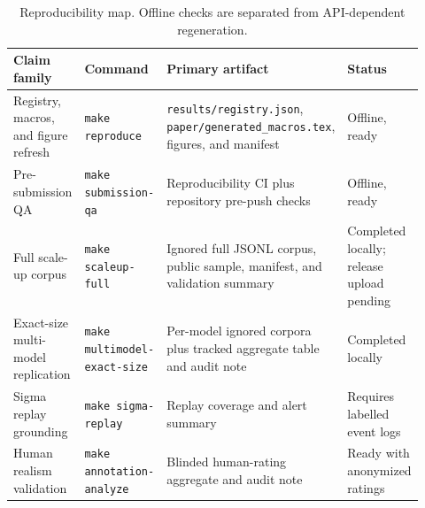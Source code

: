 \begin{table}[t]
\centering
\caption{Reproducibility map. Offline checks are separated from API-dependent regeneration.}
\label{tab:reproducibility-map}
\small
\begin{tabular}{p{0.21\linewidth}p{0.24\linewidth}p{0.28\linewidth}p{0.19\linewidth}}
\toprule
Claim family & Command & Primary artifact & Status \\
\midrule
Registry, macros, and figure refresh & \texttt{make reproduce} & \texttt{results/registry.json}, \texttt{paper/generated\_macros.tex}, figures, and manifest & Offline, ready \\
Pre-submission QA & \texttt{make submission-qa} & Reproducibility CI plus repository pre-push checks & Offline, ready \\
Full scale-up corpus & \texttt{make scaleup-full} & Ignored full JSONL corpus, public sample, manifest, and validation summary & Completed locally; release upload pending \\
Exact-size multi-model replication & \texttt{make multimodel-exact-size} & Per-model ignored corpora plus tracked aggregate table and audit note & Completed locally \\
Sigma replay grounding & \texttt{make sigma-replay} & Replay coverage and alert summary & Requires labelled event logs \\
Human realism validation & \texttt{make annotation-analyze} & Blinded human-rating aggregate and audit note & Ready with anonymized ratings \\
\bottomrule
\end{tabular}
\end{table}
